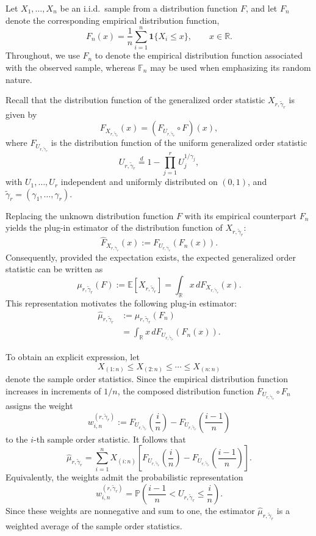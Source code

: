 \documentclass[authoryear,preprint,3p,review,10pt]{elsarticle}
\theoremstyle{definition}
\begin{document}
	Let \(X_1,\ldots,X_n\) be an i.i.d.\ sample from a distribution function
	\(F\), and let \(F_n\) denote the corresponding empirical distribution
	function,
	\[
	F_n(x)=\frac{1}{n}\sum_{i=1}^{n}\mathbf{1}\{X_i\leq x\},
	\qquad x\in\mathbb{R}.
	\]
	Throughout, we use \(F_n\) to denote the empirical distribution function
	associated with the observed sample, whereas \(\mathbb{F}_n\) may be used
	when emphasizing its random nature.
	
	Recall that the distribution function of the generalized order
	statistic \(X_{r,\tilde{\gamma}_r}\) is given by
	\[
	F_{X_{r,\tilde{\gamma}_r}}(x)
	=\left(F_{U_{r,\tilde{\gamma}_r}}\circ F\right)(x),
	\]
	where \(F_{U_{r,\tilde{\gamma}_r}}\) is the distribution function of
	the uniform generalized order statistic
	\[
	U_{r,\tilde{\gamma}_r}
	\overset{d}{=}
	1-\prod_{j=1}^{r}U_j^{1/\gamma_j},
	\]
	with \(U_1,\ldots,U_r\) independent and uniformly distributed on
	\((0,1)\), and
	\(\tilde{\gamma}_r=(\gamma_1,\ldots,\gamma_r)\).
	
	Replacing the unknown distribution function \(F\) with its empirical
	counterpart \(F_n\) yields the plug-in estimator of the distribution
	function of \(X_{r,\tilde{\gamma}_r}\):
	\[
	\widehat F_{X_{r,\tilde{\gamma}_r}}(x)
	:=
	F_{U_{r,\tilde{\gamma}_r}}\!\left(F_n(x)\right).
	\]
	Consequently, provided the expectation exists, the expected generalized
	order statistic can be written as
	\[
	\mu_{r,\tilde{\gamma}_r}(F)
	:=\mathbb{E}\!\left[X_{r,\tilde{\gamma}_r}\right]
	=\int_{\mathbb{R}}
	x\,dF_{X_{r,\tilde{\gamma}_r}}(x).
	\]
	This representation motivates the following plug-in estimator:
	\[
	\begin{aligned}
		\widehat{\mu}_{r,\tilde{\gamma}_r}
		&:=\mu_{r,\tilde{\gamma}_r}(F_n)\\
		&=\int_{\mathbb{R}}x\,
		dF_{U_{r,\tilde{\gamma}_r}}\!\left(F_n(x)\right).
	\end{aligned}
	\]
	
	To obtain an explicit expression, let
	\[
	X_{(1:n)}\leq X_{(2:n)}\leq\cdots\leq X_{(n:n)}
	\]
	denote the sample order statistics. Since the empirical distribution
	function increases in increments of \(1/n\), the composed distribution
	function \(F_{U_{r,\tilde{\gamma}_r}}\circ F_n\) assigns the weight
	\[
	w_{i,n}^{(r,\tilde{\gamma}_r)}
	:=
	F_{U_{r,\tilde{\gamma}_r}}\!\left(\frac{i}{n}\right)
	-
	F_{U_{r,\tilde{\gamma}_r}}\!\left(\frac{i-1}{n}\right)
	\]
	to the \(i\)-th sample order statistic. It follows that
	\begin{equation}\label{eq:gos_mean_estimator}
		\boxed{
			\widehat{\mu}_{r,\tilde{\gamma}_r}
			=
			\sum_{i=1}^{n}
			X_{(i:n)}
			\left[
			F_{U_{r,\tilde{\gamma}_r}}\!\left(\frac{i}{n}\right)
			-
			F_{U_{r,\tilde{\gamma}_r}}\!\left(\frac{i-1}{n}\right)
			\right].
		}
	\end{equation}
	Equivalently, the weights admit the probabilistic representation
	\[
	w_{i,n}^{(r,\tilde{\gamma}_r)}
	=
	\mathbb{P}\!\left(
	\frac{i-1}{n}<U_{r,\tilde{\gamma}_r}\leq\frac{i}{n}
	\right).
	\]
	Since these weights are nonnegative and sum to one, the estimator
	\(\widehat{\mu}_{r,\tilde{\gamma}_r}\) is a weighted average of the
	sample order statistics.
	
\end{document}
